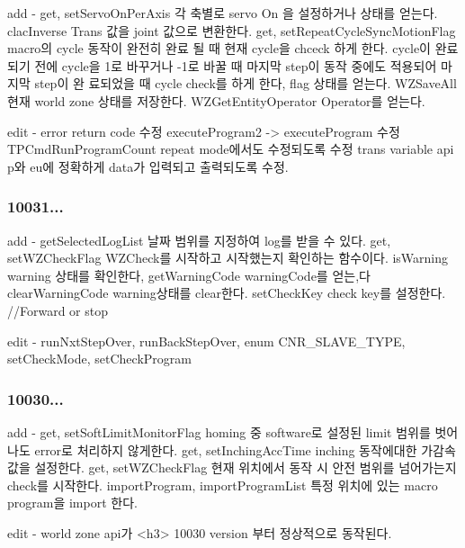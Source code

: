 \begin{DoxyVerb}     add  - get, setServoOnPerAxis 각 축별로 servo On 을 설정하거나 상태를 얻는다.
            clacInverse Trans 값을 joint 값으로 변환한다.
            get, setRepeatCycleSyncMotionFlag macro의 cycle 동작이 완전히 완료 될 때 현재 cycle을 chceck 하게 한다.
            cycle이 완료되기 전에 cycle을 1로 바꾸거나 -1로 바꿀 때 마지막 step이 동작 중에도 적용되어 마지막 step이
            완 료되었을 때 cycle check를 하게 한다, flag 상태를 얻는다.
            WZSaveAll 현재 world zone 상태를 저장한다.
            WZGetEntityOperator Operator를 얻는다.

     edit - error return code 수정
            executeProgram2 -> executeProgram 수정
            TPCmdRunProgramCount repeat mode에서도 수정되도록 수정
            trans variable api p와 eu에 정확하게 data가 입력되고 출력되도록 수정.
\end{DoxyVerb}


\subsubsection*{10031... }

\begin{DoxyVerb}     add  - getSelectedLogList 날짜 범위를 지정하여 log를 받을 수 있다.
            get, setWZCheckFlag WZCheck를 시작하고 시작했는지 확인하는 함수이다.
            isWarning warning 상태를 확인한다, getWarningCode warningCode를 얻는,다 clearWarningCode warning상태를 clear한다.
            setCheckKey check key를 설정한다. //Forward or stop

     edit - runNxtStepOver, runBackStepOver, enum CNR_SLAVE_TYPE, setCheckMode, setCheckProgram
\end{DoxyVerb}


\subsubsection*{10030... }

\begin{DoxyVerb}     add  - get, setSoftLimitMonitorFlag homing 중 software로 설정된 limit 범위를 벗어나도 error로 처리하지 않게한다.
            get, setInchingAccTime inching 동작에대한 가감속 값을 설정한다.
            get, setWZCheckFlag 현재 위치에서 동작 시 안전 범위를 넘어가는지 check를 시작한다.
            importProgram, importProgramList 특정 위치에 있는 macro program을 import 한다.

    edit  - world zone api가  <h3> 10030 version 부터 정상적으로 동작된다.
\end{DoxyVerb}


